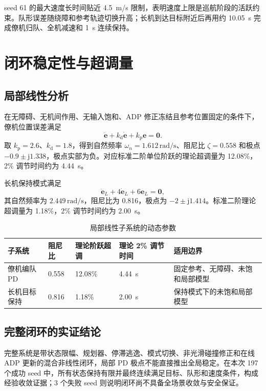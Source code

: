 \documentclass[UTF8,a4paper,12pt,fontset=windows]{ctexart}
\begin{document}
seed 61 的最大速度长时间贴近 \SI{4.5}{m/s} 限制，表明速度上限是巡航阶段的活跃约束。队形误差随绕障和参考轨迹切换升高；长机到达目标附近后再用约 \SI{10.05}{s} 完成僚机归队、全机减速和 \SI{1}{s} 连续保持。

\section{闭环稳定性与超调量}

\subsection{局部线性分析}

在无障碍、无机间作用、无输入饱和、ADP 修正冻结且参考位置固定的条件下，僚机位置误差满足
\begin{equation}
\ddot{\bm e}+k_{\mathrm d}\dot{\bm e}+k_{\mathrm p}\bm e=\bm 0.
\end{equation}
取 $k_{\mathrm p}=2.6$、$k_{\mathrm d}=1.8$，得到自然频率 $\omega_n=1.612\,\mathrm{rad/s}$、阻尼比 $\zeta=0.558$ 和极点 $-0.9\pm\mathrm{j}1.338$，极点实部为负。对应标准二阶单位阶跃的理论超调量为 12.08\%，2\% 调节时间约为 \SI{4.44}{s}。

长机保持模式满足
\begin{equation}
\ddot{\bm e}_L+4\dot{\bm e}_L+6\bm e_L=\bm 0,
\end{equation}
其自然频率为 $2.449\,\mathrm{rad/s}$，阻尼比为 0.816，极点为 $-2\pm\mathrm{j}1.414$。标准二阶理论超调量为 1.18\%，2\% 调节时间约为 \SI{2.00}{s}。

\begin{table}[H]
\centering
\caption{局部线性子系统的动态参数}
\label{tab:stability}
\begin{tabularx}{0.94\textwidth}{@{}lC{2.0cm}C{2.6cm}C{3.0cm}Y@{}}
\toprule
子系统 & 阻尼比 & 理论阶跃超调 & 理论 2\% 调节时间 & 适用边界 \\
\midrule
僚机编队 PD & 0.558 & 12.08\% & \SI{4.44}{s} & 固定参考、无障碍、未饱和局部模型 \\
长机目标保持 & 0.816 & 1.18\% & \SI{2.00}{s} & 保持模式下的未饱和局部模型 \\
\bottomrule
\end{tabularx}
\end{table}

\subsection{完整闭环的实证结论}

完整系统是带状态限幅、规划器、停滞逃逸、模式切换、非光滑碰撞修正和在线 ADP 更新的混合非线性闭环，局部 PD 极点不能直接推出全局稳定。在本次 197 个成功 seed 中，所有状态保持有限并最终连续满足目标、队形和速度条件，构成经验收敛证据；3 个失败 seed 则说明闭环尚不具备全场景收敛与安全保证。
\end{document}
